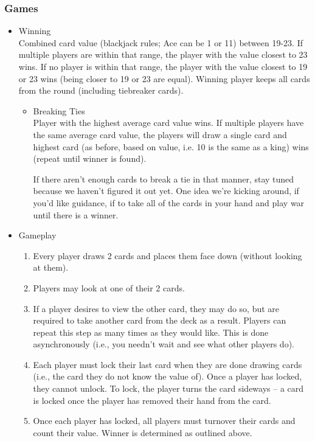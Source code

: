 \documentclass[11pt]{article}
\begin{document}
\subsubsection{Games}
\label{sec-2-2-2}
\begin{itemize}

\item Winning\\
\label{sec-2-2-2-1}%
Combined card value (blackjack rules; Ace can be 1 or 11) between
19-23. If multiple players are within that range, the player with the
value closest to 23 wins. If no player is within that range, the
player with the value closest to 19 or 23 wins (being closer to 19 or
23 are equal). Winning player keeps all cards from the round
(including tiebreaker cards). 

\begin{itemize}

\item Breaking Ties\\
\label{sec-2-2-2-1-1}%
Player with the highest average card value wins. If multiple players
have the same average card value, the players will draw a single card
and highest card (as before, based on value, i.e. 10 is the same as a
king) wins (repeat until winner is found). 

If there aren't enough cards to break a tie in that manner, stay tuned
because we haven't figured it out yet. One idea we're kicking around,
if you'd like guidance, if to take all of the cards in your hand and
play war until there is a winner.

\end{itemize} %

\item Gameplay\\
\label{sec-2-2-2-2}%
\begin{enumerate}
\item Every player draws 2 cards and places them face down (without
   looking at them).
\item Players may look at one of their 2 cards.
\item If a player desires to view the other card, they may do so, but
   are required to take another card from the deck as a result.
   Players can repeat this step as many times as they would like. This
   is done asynchronously (i.e., you needn't wait and see what other
   players do).
\item Each player must lock their last card when they are done
   drawing cards (i.e., the card they do not know the value of). Once
   a player has locked, they cannot unlock. To lock, the player turns
   the card sideways -- a card is locked once the player has removed
   their hand from the card.
\item Once each player has locked, all players must turnover their cards
   and count their value. Winner is determined as
   outlined above.
\end{enumerate}

\end{itemize} %
\end{document}
